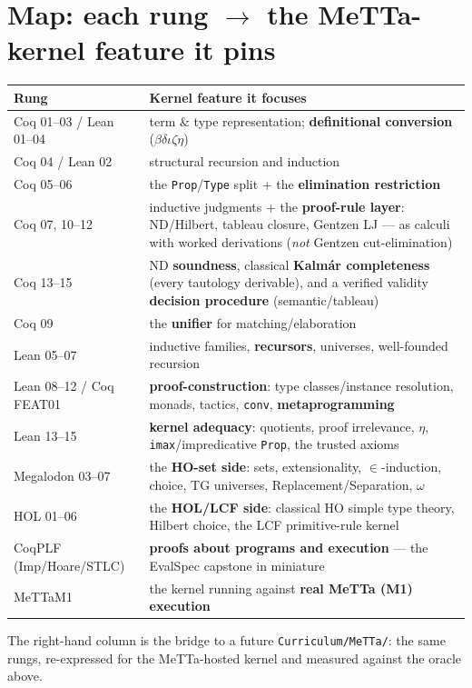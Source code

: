 \documentclass[11pt]{article}
\begin{document}
\section{Map: each rung $\to$ the MeTTa-kernel feature it pins}
\begin{center}\small
\begin{tabular}{@{}lp{8.2cm}@{}}
\toprule
Rung & Kernel feature it focuses \\
\midrule
Coq 01--03 / Lean 01--04 & term \& type representation; \textbf{definitional conversion} ($\beta\delta\iota\zeta\eta$) \\
Coq 04 / Lean 02         & structural recursion and induction \\
Coq 05--06               & the \texttt{Prop}/\texttt{Type} split + the \textbf{elimination restriction} \\
Coq 07, 10--12           & inductive judgments + the \textbf{proof-rule layer}: ND/Hilbert, tableau closure, Gentzen LJ --- as calculi with worked derivations (\emph{not} Gentzen cut-elimination) \\
Coq 13--15               & ND \textbf{soundness}, classical \textbf{Kalmár completeness} (every tautology derivable), and a verified validity \textbf{decision procedure} (semantic/tableau) \\
Coq 09                   & the \textbf{unifier} for matching/elaboration \\
Lean 05--07              & inductive families, \textbf{recursors}, universes, well-founded recursion \\
Lean 08--12 / Coq FEAT01 & \textbf{proof-construction}: type classes/instance resolution, monads, tactics, \texttt{conv}, \textbf{metaprogramming} \\
Lean 13--15              & \textbf{kernel adequacy}: quotients, proof irrelevance, $\eta$, \texttt{imax}/impredicative \texttt{Prop}, the trusted axioms \\
Megalodon 03--07         & the \textbf{HO-set side}: sets, extensionality, $\in$-induction, choice, TG universes, Replacement/Separation, $\omega$ \\
HOL 01--06               & the \textbf{HOL/LCF side}: classical HO simple type theory, Hilbert choice, the LCF primitive-rule kernel \\
CoqPLF (Imp/Hoare/STLC)  & \textbf{proofs about programs and execution} --- the EvalSpec capstone in miniature \\
MeTTaM1                  & the kernel running against \textbf{real MeTTa (M1) execution} \\
\bottomrule
\end{tabular}
\end{center}

\noindent The right-hand column is the bridge to a future \texttt{Curriculum/MeTTa/}: the same rungs,
re-expressed for the MeTTa-hosted kernel and measured against the oracle above.
\end{document}
